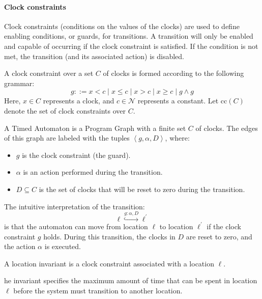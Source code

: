 \paragraph*{Clock constraints}
Clock constraints (conditions on the values of the clocks) are used to define enabling conditions, or guards, for transitions. 
A transition will only be enabled and capable of occurring if the clock constraint is satisfied. 
If the condition is not met, the transition (and its associated action) is disabled.
\begin{definition}
    A clock constraint over a set $C$ of clocks is formed according to the following grammar:
    \[g::=x<c\mid x\leq c\mid x>c \mid x\geq c\mid g\land g\]   
    Here, $x\in C$ represents a clock, and  $c\in\mathcal{N}$ represents a constant.
    Let $\text{cc}(C)$ denote the set of clock constraints over $C$.  
\end{definition}
\noindent A Timed Automaton is a Program Graph with a finite set $C$ of clocks.
The edges of this graph are labeled with the tuples $\left\langle g, \alpha, D\right\rangle$, where:
\begin{itemize}
    \item $g$ is the clock constraint (the guard).
    \item $\alpha$ is an action performed during the transition.
    \item $D\subseteq C$ is the set of clocks that will be reset to zero during the transition.
\end{itemize} 
\noindent The intuitive interpretation of the transition:
\[\ell\overset{g:\alpha,D}{\hookrightarrow}\ell^\prime\]
\noindent is that the automaton can move from location $\ell$ to location $\ell^\prime$ if the clock constraint $g$ holds. 
During this transition, the clocks in $D$ are reset to zero, and the action $\alpha$ is executed.
\begin{definition}
    A location invariant is a clock constraint associated with a location $\ell$. 
\end{definition}
\noindent he invariant specifies the maximum amount of time that can be spent in location $\ell$ before the system must transition to another location.

